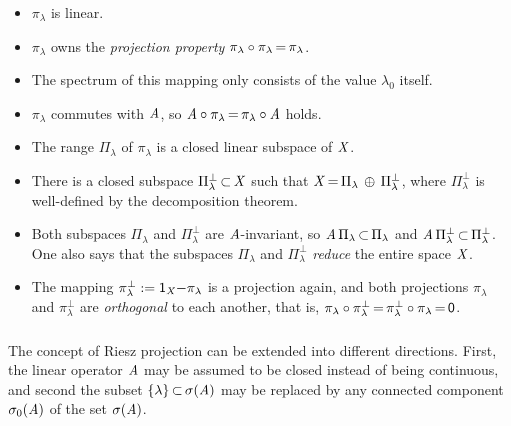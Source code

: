 \documentclass[11pt,twoside]{article}
\begin{document}
\begin{itemize}[leftmargin=12pt]
\item[1.]
$\pi_{\lambda}$ is linear.

\item[2.]
$\pi_{\lambda}$ owns the \textit{projection property}
$\pi_{\lambda} \circ \pi_{\lambda} {\,=\,} \pi_{\lambda}$.

\item[3.]
The spectrum of this mapping only consists of the value $\lambda_0$ itself.

\item[4.]
$\pi_{\lambda}$ commutes with $\mathit{A}$,
so $\mathit{A} \circ \pi_{\lambda} {\,=\,} \pi_{\lambda} \circ \mathit{A}$ holds.

\item[5.]
The range $\Pi_{\lambda}$ of $\pi_{\lambda}$
is a closed linear subspace of $\mathit{X}$.

\item[6.]
There is a closed subspace $\Pi_{\lambda}^{\bot} {\,\subset\,} \mathit{X}$
such that
$\mathit{X} {\,=\,} \Pi_{\lambda} \, \oplus \, \Pi_{\lambda}^{\bot}$,
where $\Pi_{\lambda}^{\bot}$ is well-defined by the decomposition theorem.

\item[7.]
Both subspaces $\Pi_{\lambda}$ and $\Pi_{\lambda}^{\bot}$
are $\mathit{A}$-invariant, so
$\mathit{A} \, \Pi_{\lambda}        {\,\subset\,} \Pi_{\lambda}$ and
$\mathit{A} \, \Pi_{\lambda}^{\bot} {\,\subset\,} \Pi_{\lambda}^{\bot}$.
One also says that the subspaces 
$\Pi_{\lambda}$ and $\Pi_{\lambda}^{\bot}$
\textit{reduce} the entire space $\mathit{X}$.

\item[8.]
The mapping $\pi_{\lambda}^{\bot} := {\mathsf{1}}_{\mathit{X}} {-} \pi_{\lambda}$
is a projection again,
and both projections $\pi_{\lambda}$ and $\pi_{\lambda}^{\bot}$
are \textit{orthogonal} to each another,
that is,
$\pi_{\lambda}        \circ \pi_{\lambda}^{\bot} {\,=\,} 
 \pi_{\lambda}^{\bot} \circ \pi_{\lambda}        {\,=\,} {\mathsf{0}}$.
\end{itemize}

\subparagraph{}
The concept of {Riesz projection} can be extended into different directions.
First,
the linear operator $\mathit{A}$ may be assumed to be closed
instead of being continuous,
and second
the subset $\{\lambda\} {\,\subset\,} \sigma(\mathit{A})$ may be replaced
by any connected component $\sigma_0(\mathit{A})$ of the set $\sigma(\mathit{A})$.

\end{document}
